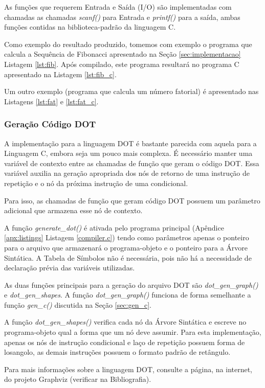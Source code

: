 As funções que requerem Entrada e Saída (I/O) são implementadas com chamadas
as chamadas \emph{scanf()} para Entrada e \emph{printf()} para a saída, ambas
funções contidas na biblioteca-padrão da linguagem C.

Como exemplo do resultado produzido, tomemos com exemplo o programa que
calcula a Sequência de Fibonacci apresentado na Seção \ref{sec:implementacao}
Listagem \ref{lst:fib}. Após compilado, este programa resultará no programa C
apresentado na Listagem \ref{lst:fib_c}.



Um outro exemplo (programa que calcula um número fatorial) é apresentado nas
Listagens \ref{lst:fat} e \ref{lst:fat_c}.





\subsubsection{Geração Código DOT}
\label{sec:gen_dot}

A implementação para a linguagem DOT é bastante parecida com aquela para a
Linguagem C, embora seja um pouco mais complexa. É necessário manter uma
variável de contexto entre as chamadas de função que geram o código DOT.
Essa variável auxilia na geração apropriada dos nós de retorno de uma
instrução de repetição e o nó da próxima instrução de uma condicional.

Para isso, as chamadas de função que geram código DOT possuem um parâmetro
adicional que armazena esse nó de contexto.

A função \emph{generate\_dot()} é ativada pelo programa principal
(Apêndice \ref{apx:listings} Listagem \ref{compiler.c}) tendo como parâmetros
apenas o ponteiro para o arquivo que armazenará o programa-objeto e o ponteiro
para a Árvore Sintática. A Tabela de Símbolos não é necessária, pois não há a
necessidade de declaração prévia das variáveis utilizadas.

As duas funções principais para a geração do arquivo DOT são
\emph{dot\_gen\_graph()} e \emph{dot\_gen\_shapes}. A função
\emph{dot\_gen\_graph()} funciona de forma semelhante a função
\emph{gen\_c()} discutida na Seção \ref{sec:gen_c}.

A função \emph{dot\_gen\_shapes()} verifica cada nó da Árvore Sintática e
escreve no programa-objeto qual a forma que um nó deve assumir. Para esta
implementação, apenas os nós de instrução condicional e laço de repetição
possuem forma de losangolo, as demais instruções possuem o formato padrão de
retângulo.

Para mais informações sobre a linguagem DOT, consulte a página, na internet, do
projeto Graphviz (verificar na Bibliografia).

